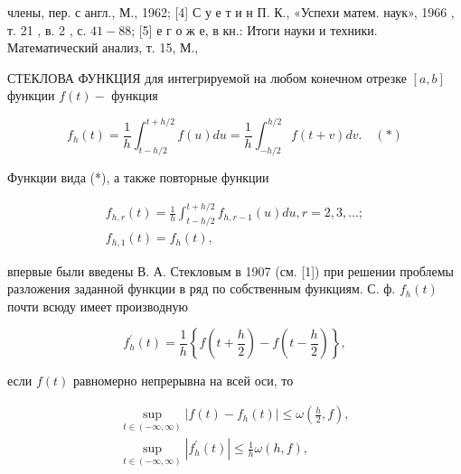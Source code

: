 \documentclass[10pt]{article}
\begin{document}
члены, пер. с англ., М., 1962; [4] С у е т и н П. К., «Успехи матем. наук», 1966 , т. 21 , в. 2 , с. $41-88$; [5] е г о ж е, в кн.: Итоги науки и техники. Математический анализ, т. 15, М.,



СТЕКЛОВА ФУНКЦИЯ для интегрируемой на любом конечном отрезке $[a, b]$ функции $f(t)-$ функция



\[

f_{h}(t)=\frac{1}{h} \int_{t-h / 2}^{t+h / 2} f(u) d u=\frac{1}{h} \int_{-h / 2}^{h / 2} f(t+v) d v . \quad(*)

\]



Функции вида (*), а также повторные функции



\[

\begin{gathered}

f_{h, r}(t)=\frac{1}{h} \int_{t-h / 2}^{t+h / 2} f_{h, r-1}(u) d u, r=2,3, \ldots ; \\

f_{h, 1}(t)=f_{h}(t),

\end{gathered}

\]



впервые были введены В. А. Стекловым в 1907 (см. [1]) при решении проблемы разложения заданной функции в ряд по собственным функциям. С. ф. $f_{h}(t)$ почти всюду имеет производную



\[

f_{h}^{\prime}(t)=\frac{1}{h}\left\{f\left(t+\frac{h}{2}\right)-f\left(t-\frac{h}{2}\right)\right\},

\]



если $f(t)$ равномерно непрерывна на всей оси, то



\[

\begin{gathered}

\sup _{t \in(-\infty, \infty)}\left|f(t)-f_{h}(t)\right| \leqslant \omega\left(\frac{h}{2}, f\right), \\

\sup _{t \in(-\infty, \infty)}\left|f_{h}^{\prime}(t)\right| \leqslant \frac{1}{h} \omega(h, f),

\end{gathered}

\]
\end{document}

